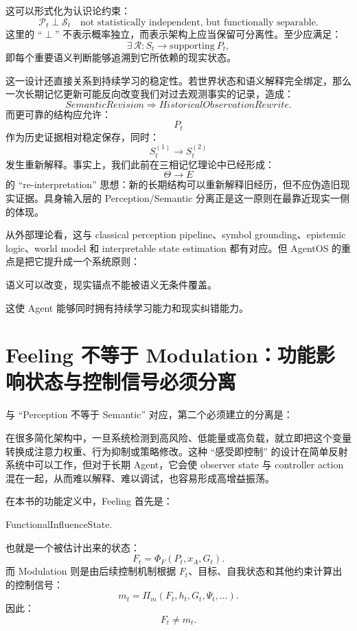这可以形式化为认识论约束：
\[
\mathcal P_t
\perp
\mathcal S_t
\quad\text{not statistically independent, but functionally separable}.
\]
这里的 ``$\perp$'' 不表示概率独立，而表示架构上应当保留可分离性。至少应满足：
\[
\exists\,
\mathcal R:
S_t
\rightarrow
\mathrm{supporting}\ P_t,
\]
即每个重要语义判断能够追溯到它所依赖的现实状态。

这一设计还直接关系到持续学习的稳定性。若世界状态和语义解释完全绑定，那么一次长期记忆更新可能反向改变我们对过去观测事实的记录，造成：
\[
SemanticRevision
\Rightarrow
HistoricalObservationRewrite.
\]
而更可靠的结构应允许：
\[
P_t
\]
作为历史证据相对稳定保存，同时：
\[
S_t^{(1)}
\rightarrow
S_t^{(2)}
\]
发生重新解释。事实上，我们此前在三相记忆理论中已经形成：
\[
\Theta\rightarrow E
\]
的 ``re-interpretation'' 思想：新的长期结构可以重新解释旧经历，但不应伪造旧现实证据。具身输入层的 Perception/Semantic 分离正是这一原则在最靠近现实一侧的体现。

从外部理论看，这与 classical perception pipeline、symbol grounding、epistemic logic、world model 和 interpretable state estimation 都有对应。但 AgentOS 的重点是把它提升成一个系统原则：
\begin{proposition*}
语义可以改变，现实锚点不能被语义无条件覆盖。
\end{proposition*}
这使 Agent 能够同时拥有持续学习能力和现实纠错能力。

\section{Feeling 不等于 Modulation：功能影响状态与控制信号必须分离}
\label{sec:feeling-not-modulation}

与 ``Perception 不等于 Semantic'' 对应，第二个必须建立的分离是：
\begin{statementbox}
\centering
{}
\end{statementbox}
在很多简化架构中，一旦系统检测到高风险、低能量或高负载，就立即把这个变量转换成注意力权重、行为抑制或策略修改。这种 ``感受即控制'' 的设计在简单反射系统中可以工作，但对于长期 Agent，它会使 observer state 与 controller action 混在一起，从而难以解释、难以调试，也容易形成高增益振荡。

在本书的功能定义中，Feeling 首先是：
\begin{statementbox}
FunctionalInfluenceState.
\end{statementbox}
也就是一个被估计出来的状态：
\[
F_t
=
\Phi_F(P_t,x_A,G_t).
\]
而 Modulation 则是由后续控制机制根据 $F_t$、目标、自我状态和其他约束计算出的控制信号：
\[
m_t
=
\Pi_m(
F_t,
h_t,
G_t,
\Psi_t,\ldots
).
\]
因此：
\[
\boxed{
F_t
\neq
m_t.
}
\]

